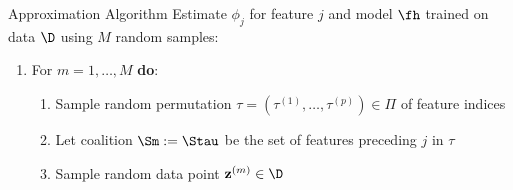 \documentclass[11pt,compress,t,notes=noshow, aspectratio=169, xcolor=table]{beamer}
\begin{document}
\begin{frame}{Approximation Algorithm }
Estimate $\phi_j$ for feature $j$ and model $\fh$ trained on data $\D$ using $M$ random samples:

  \begin{enumerate}[<+->]
      \item For $m = 1, \ldots, M$ \textbf{do}:
      \begin{enumerate}
        \item Sample random permutation $\tau = (\tau^{(1)}, \ldots, \tau^{(p)}) \in \Pi$ of feature indices%
        \item Let coalition $\Sm := \Stau$ be the set of features preceding $j$ in $\tau$
        \item Sample random data point $\mathbf{z}^{(m)} \in \D$%

\end{enumerate}
\end{enumerate}
\end{frame}
\end{document}
